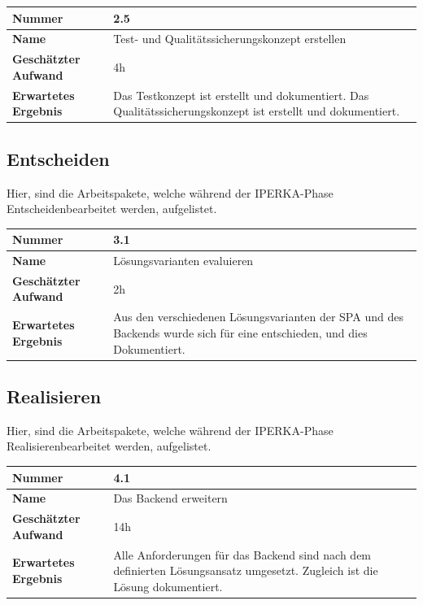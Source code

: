 \begin{longtable}{p{}|p{}}
	\hline
	\textbf{Nummer}    				& 2.5 \\
	\hline
	\textbf{Name}   				& Test- und Qualitätssicherungskonzept erstellen\\
	\hline
	\textbf{Geschätzter Aufwand}	& 4h \\
	\hline
	\textbf{Erwartetes Ergebnis}	& Das Testkonzept ist erstellt und dokumentiert. Das Qualitätssicherungskonzept ist erstellt und dokumentiert.\\
	\hline
\end{longtable}

\subsection{Entscheiden}
Hier, sind die Arbeitspakete, welche während der IPERKA-Phase \flqq Entscheiden\frqq{}\space bearbeitet werden, aufgelistet.

\begin{longtable}{p{}|p{}}
	\hline
	\textbf{Nummer}    				& 3.1 \\
	\hline
	\textbf{Name}   				& Lösungsvarianten evaluieren \\
	\hline
	\textbf{Geschätzter Aufwand}	& 2h \\
	\hline
	\textbf{Erwartetes Ergebnis}	& Aus den verschiedenen Lösungsvarianten der SPA und des Backends wurde sich für eine entschieden, und dies Dokumentiert.\\
	\hline
\end{longtable}\pagebreak

\subsection{Realisieren}
Hier, sind die Arbeitspakete, welche während der IPERKA-Phase \flqq Realisieren\frqq{}\space bearbeitet werden, aufgelistet.

\begin{longtable}{p{}|p{}}
	\hline
	\textbf{Nummer}    				& 4.1 \\
	\hline
	\textbf{Name}   				& Das Backend erweitern  \\
	\hline
	\textbf{Geschätzter Aufwand}	& 14h \\
	\hline
	\textbf{Erwartetes Ergebnis}	& Alle Anforderungen für das Backend sind nach dem definierten Lösungsansatz umgesetzt. Zugleich ist die Lösung dokumentiert. \\
	\hline
\end{longtable}

